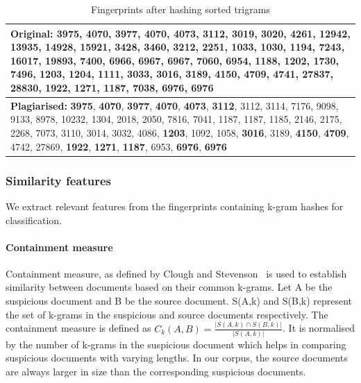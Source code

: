 \documentclass[11pt]{article}
\begin{document}
\begin{table}[h]
\footnotesize
\begin{tabularx}{\columnwidth}{|X|}
\hline
\textbf{Original:} \textbf{3975}, \textbf{4070}, \textbf{3977}, \textbf{4070}, \textbf{4073}, \textbf{3112}, 3019, 3020, 4261, 12942, 13935, 14928, 15921, 3428, 3460, 3212, 2251, 1033, 1030, 1194, 7243, 16017, 19893, 7400, 6966, 6967, 6967, 7060, 6954, 1188, 1202, 1730, 7496, \textbf{1203}, 1204, 1111, 3033, \textbf{3016}, 3189, \textbf{4150}, \textbf{4709}, 4741, 27837, 28830, \textbf{1922}, \textbf{1271}, \textbf{1187}, 7038, \textbf{6976}, \textbf{6976}\\
\hline
\textbf{Plagiarised:} \textbf{3975}, \textbf{4070}, \textbf{3977}, \textbf{4070}, \textbf{4073}, \textbf{3112}, 3112, 3114, 7176, 9098, 9133, 8978, 10232, 1304, 2018, 2050, 7816, 7041, 1187, 1187, 1185, 2146, 2175, 2268, 7073, 3110, 3014, 3032, 4086,\textbf{ 1203}, 1092, 1058, \textbf{3016}, 3189, \textbf{4150},\textbf{ 4709}, 4742, 27869, \textbf{1922},\textbf{ 1271}, \textbf{1187}, 6953, \textbf{6976}, \textbf{6976}
\\
\hline
\end{tabularx}
\caption{Fingerprints after hashing sorted trigrams}
 \label{hash}
\end{table}

\subsubsection*{Similarity features}
We extract relevant features from the fingerprints containing k-gram hashes for classification.

\paragraph{Containment measure}  Containment measure, as defined by Clough and Stevenson~ is used to establish similarity between documents based on their common k-grams. Let A be the suspicious document and B be the source document. S(A,k) and S(B,k) represent the set of k-grams in the suspicious and source documents respectively. The containment measure is defined  as {\small $C_{k}(A,B) =  \frac{{\displaystyle|S(A, k) \cap S(B, k)|}}{ {\displaystyle|S(A, k)|}}$}. It is normalised by the number of k-grams in the suspicious document which helps in comparing suspicious documents with varying lengths. In our corpus, the source documents are always larger in size than the corresponding suspicious documents.
 
\end{document}
